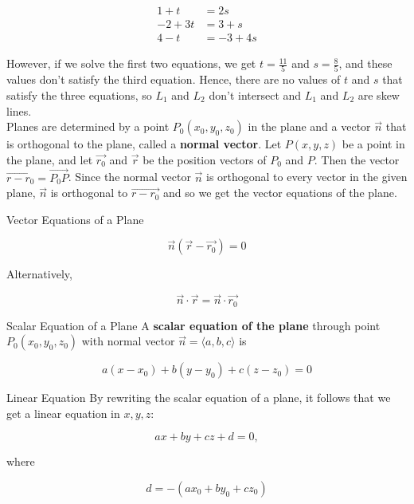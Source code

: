         \begin{align*}
            1 + t   &= 2s \\
            -2 + 3t &= 3 + s \\
            4 - t   &= -3 + 4s
        \end{align*}

        However, if we solve the first two equations, we get $t = \frac{11}{5}$ and $s = \frac{8}{5}$, and these values don't satisfy the third equation. Hence, there are no values of $t$ and $s$ that satisfy the three
        equations, so $L_1$ and $L_2$ don't intersect and $L_1$ and $L_2$ are skew lines. \\

        Planes are determined by a point $P_0(x_0, y_0, z_0)$ in the plane and a vector $\vec{n}$ that is orthogonal to the plane, called a \textbf{normal vector}. Let $P(x,y,z)$ be a point in the plane, and let
        $\vec{r_0}$ and $\vec{r}$ be the position vectors of $P_0$ and $P$. Then the vector $\vec{r-r_0}=\vec{P_0 P}$. Since the normal vector $\vec{n}$ is orthogonal to every vector in the given plane, $\vec{n}$ is
        orthogonal to $\vec{r - r_0}$ and so we get the vector equations of the plane.

        \begin{axiom}{Vector Equations of a Plane}

            \[
                \vec{n}(\vec{r}-\vec{r_0}) = 0
            \]

            Alternatively,

            \[
                \vec{n}\cdot\vec{r} = \vec{n}\cdot \vec{r_0}
            \]
        \end{axiom}

        \begin{axiom}{Scalar Equation of a Plane}
            A \textbf{scalar equation of the plane} through point $P_0(x_0, y_0,z_0)$ with normal vector $\vec{n} = \langle a,b,c\rangle$ is

            \[
                a(x-x_0) + b(y-y_0) + c(z-z_0) = 0
            \]
        \end{axiom}

        \begin{axiom}{Linear Equation}
            By rewriting the scalar equation of a plane, it follows that we get a linear equation in $x,y,z$:

            \[
                ax + by + cz + d = 0,
            \]

            where

            \[
                d = -(ax_0 + by_0 + cz_0)
            \]
        \end{axiom}

